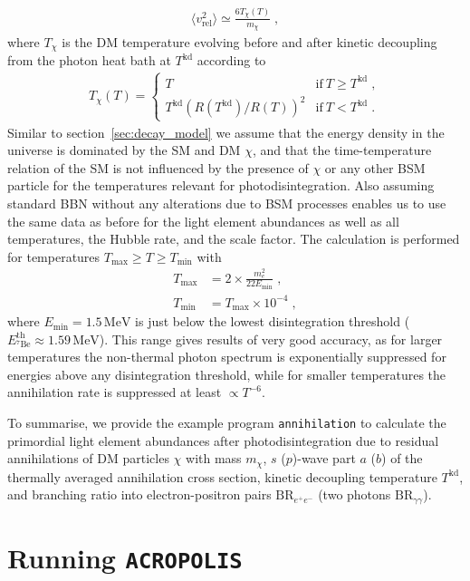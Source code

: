 \documentclass[11pt,a4paper]{article}
\newcommand{\eqsp}{\;}
\begin{document}
\begin{align}
\langle v_\mathrm{rel}^2 \rangle \simeq \frac{6 T_\chi (T)}{m_\chi}\eqsp,
\end{align}
where $T_\chi$ is the DM temperature evolving before and after kinetic decoupling from the photon heat bath at $T^\mathrm{kd}$ according to
\begin{align}
T_\chi (T) = \begin{cases} T & \text{if}~T \geq T^\mathrm{kd} \eqsp, \\
T^\mathrm{kd} (R(T^\mathrm{kd}) / R(T))^2 & \text{if}~T < T^\mathrm{kd}\eqsp. \end{cases}
\end{align}
Similar to section~\ref{sec:decay_model} we assume that the energy density in the universe is dominated by the SM and DM $\chi$, and that the time-temperature relation of the SM is not influenced by the presence of $\chi$ or any other BSM particle for the temperatures relevant for photodisintegration. Also assuming standard BBN without any alterations due to BSM processes enables us to use the same data as before for the light element abundances as well as all temperatures, the Hubble rate, and the scale factor. The calculation is performed for temperatures $T_\mathrm{max} \geq T \geq T_\mathrm{min}$ with
\begin{align}
T_\mathrm{max} &= 2 \times \frac{m_e^2}{22 E_\mathrm{min}} \eqsp, \\
T_\mathrm{min} &= T_\mathrm{max} \times 10^{-4}\eqsp,
\end{align}
where $E_\mathrm{min} = 1.5 \, \mathrm{MeV}$ is just below the lowest disintegration threshold ($E_{{}^7\mathrm{Be}}^\mathrm{th} \approx 1.59 \, \mathrm{MeV}$). This range gives results of very good accuracy, as for larger temperatures the non-thermal photon spectrum is exponentially suppressed for energies above any disintegration threshold, while for smaller temperatures the annihilation rate is suppressed at least $\propto T^{-6}$.

To summarise, we provide the example program \texttt{annihilation} to calculate the primordial light element abundances after photodisintegration due to residual annihilations of DM particles $\chi$ with mass $m_\chi$, $s$ ($p$)-wave part $a$ ($b$) of the thermally averaged annihilation cross section, kinetic decoupling temperature $T^\mathrm{kd}$, and branching ratio into electron-positron pairs $\text{BR}_{e^+ e^-}$ (two photons $\text{BR}_{\gamma \gamma}$).

\section{Running \texttt{ACROPOLIS}}
\end{document}

